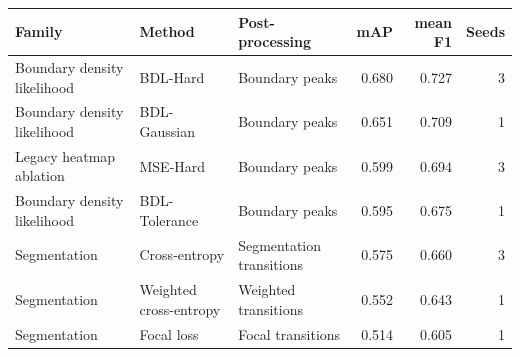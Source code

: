 \begin{tabular}{lllrrr}
\toprule
Family & Method & Post-processing & mAP & mean F1 & Seeds \\
\midrule
Boundary density likelihood & BDL-Hard & Boundary peaks & 0.680 & 0.727 & 3 \\
Boundary density likelihood & BDL-Gaussian & Boundary peaks & 0.651 & 0.709 & 1 \\
Legacy heatmap ablation & MSE-Hard & Boundary peaks & 0.599 & 0.694 & 3 \\
Boundary density likelihood & BDL-Tolerance & Boundary peaks & 0.595 & 0.675 & 1 \\
Segmentation & Cross-entropy & Segmentation transitions & 0.575 & 0.660 & 3 \\
Segmentation & Weighted cross-entropy & Weighted transitions & 0.552 & 0.643 & 1 \\
Segmentation & Focal loss & Focal transitions & 0.514 & 0.605 & 1 \\
\bottomrule
\end{tabular}
